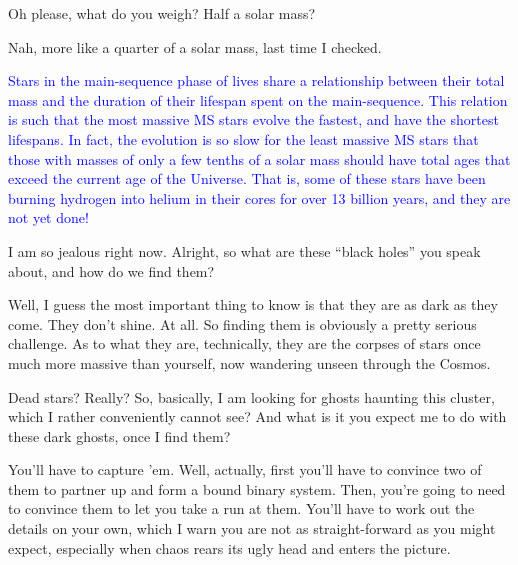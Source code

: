 \documentclass[main.tex]{subfiles}
\begin{document}
\par \Sterope Oh please, what do you weigh?  Half a solar mass?

\par \Enrico Nah, more like a quarter of a solar mass, last time I checked.

\begin{tcolorbox}[sharp corners, colback=blue!30, colframe=blue!80!blue, title=Main-Sequence Lifetimes]
\par \textcolor{blue} {Stars in the main-sequence phase of lives share a relationship between their total mass and the duration of their lifespan spent on the main-sequence.  This relation is such that the most massive MS stars evolve the fastest, and have the shortest lifespans.  In fact, the evolution is so slow for the least massive MS stars that those with masses of only a few tenths of a solar mass should have total ages that exceed the current age of the Universe.  That is, some of these stars have been burning hydrogen into helium in their cores for over 13 billion years, and they are not yet done!
} 
\end{tcolorbox} 

\par \Sterope I am so jealous right now.  Alright, so what are these ``black holes'' you speak about, and how do we find them?



\par \Enrico Well, I guess the most important thing to know is that they are as dark as they come.  They don't shine.  At all.  So finding them is obviously a pretty serious challenge.  As to what they are, technically, they are the corpses of stars once much more massive than yourself, now wandering unseen through the Cosmos.

\par \Sterope  Dead stars?  Really?  So, basically, I am looking for ghosts haunting this cluster, which I rather conveniently cannot see?  And what is it you expect me to do with these dark ghosts, once I find them?

\par \Enrico You'll have to capture 'em.  Well, actually, first you'll have to convince two of them to partner up and form a bound binary system.  Then, you're going to need to convince them to let you take a run at them.  You'll have to work out the details on your own, which I warn you are not as straight-forward as you might expect, especially when chaos rears its ugly head and enters the picture.
\end{document}
